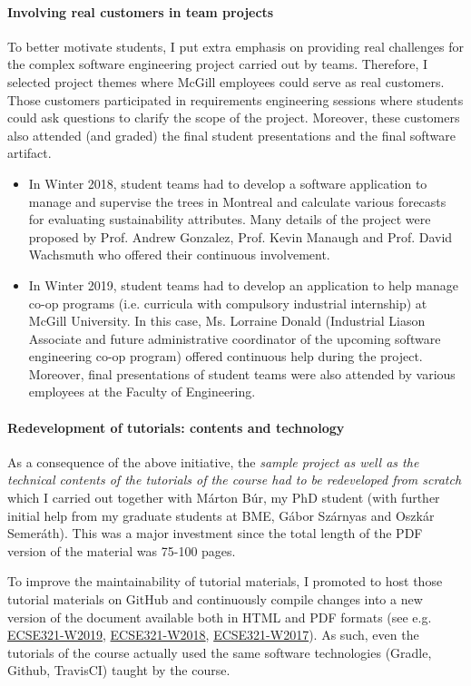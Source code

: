 \documentclass[a4paper,11pt]{article}
\begin{document}
\paragraph{Involving real customers in team projects}

To better motivate students, I put extra emphasis on providing real challenges for the complex software engineering project carried out by teams. Therefore, I selected project themes where McGill employees could serve as real customers. Those customers participated in requirements engineering sessions where students could ask questions to clarify the scope of the project. Moreover, these customers also attended (and graded) the final student presentations and the final software artifact.
\begin{itemize}
\item In Winter 2018, student teams had to develop a software application to manage and supervise the trees in Montreal and calculate various forecasts for evaluating sustainability attributes. Many details of the project were proposed by Prof. Andrew Gonzalez, Prof. Kevin Manaugh and Prof. David Wachsmuth who offered their continuous involvement.
\item In Winter 2019, student teams had to develop an application to help manage co-op programs (i.e. curricula with compulsory industrial internship) at McGill University. In this case, Ms. Lorraine Donald (Industrial Liason Associate and future administrative coordinator of the upcoming software engineering co-op program) offered continuous help during the project. Moreover, final presentations of student teams were also attended by various employees at the Faculty of Engineering.
\end{itemize}


\paragraph{Redevelopment of tutorials: contents and technology}
As a consequence of the above initiative, the \emph{sample project as well as the technical contents of the tutorials of the course had to be redeveloped from scratch} which I carried out together with Márton Búr, my PhD student (with further initial help from my graduate students at BME, Gábor Szárnyas and Oszkár Semeráth). This was a major investment since the total length of the PDF version of the material was 75-100 pages. 

To improve the maintainability of tutorial materials, I promoted to host those tutorial materials on GitHub and continuously compile changes into a new version of the document available both in HTML and PDF formats (see e.g. 
\href{https://mcgill-ecse321-winter2019.github.io/EventRegistration-Tutorials/}{ECSE321-W2019}, 
\href{https://mcgill-ecse321-winter2018.github.io/EventRegistration-Tutorials/}{ECSE321-W2018}, 
\href{https://ecse321-winter2017-mcgill.github.io/EventRegistration-Tutorials/}{ECSE321-W2017}). As such, even the tutorials of the course actually used the same software technologies (Gradle, Github, TravisCI) taught by the course. 
\end{document}

